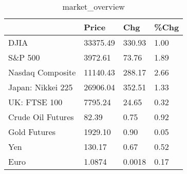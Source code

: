 \documentclass{article}%
\begin{document}
%


\begin{table}[htbp]%
\caption{market\_overview}%
\centering%
\begin{adjustbox}{width=1\textwidth}%
\begin{tabular}{llll}
\toprule
                  &    Price &    Chg & \%Chg \\
\midrule
             DJIA & 33375.49 & 330.93 & 1.00 \\
          S\&P 500 &  3972.61 &  73.76 & 1.89 \\
 Nasdaq Composite & 11140.43 & 288.17 & 2.66 \\
Japan: Nikkei 225 & 26906.04 & 352.51 & 1.33 \\
     UK: FTSE 100 &  7795.24 &  24.65 & 0.32 \\
Crude Oil Futures &    82.39 &   0.75 & 0.92 \\
     Gold Futures &  1929.10 &   0.90 & 0.05 \\
              Yen &   130.17 &   0.67 & 0.52 \\
             Euro &   1.0874 & 0.0018 & 0.17 \\
\bottomrule
\end{tabular}
%
\end{adjustbox}%
\end{table}

%
\end{document}
